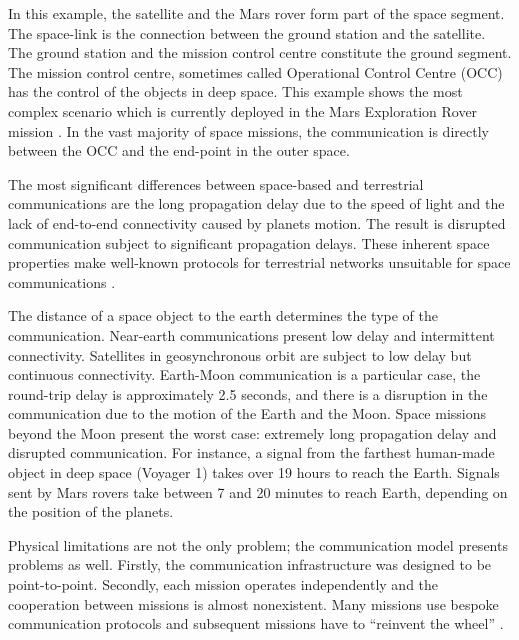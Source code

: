 In this example, the satellite and the Mars rover form part of the space segment. The space-link is the connection between the ground station and the satellite.  The ground station and the mission control centre constitute the ground segment. The mission control centre, sometimes called Operational Control Centre (OCC) has the control of the objects in deep space. This example shows the most complex scenario which is currently deployed in the Mars Exploration Rover mission \cite{crisp2003mars}. In the vast majority of space missions, the communication is directly between the OCC and the end-point in the outer space.

 The most significant differences between space-based and terrestrial communications are the long propagation delay due to the speed of light and the lack of end-to-end connectivity caused by planets motion. The result is disrupted communication subject to significant propagation delays. These inherent space properties make well-known protocols for terrestrial networks unsuitable for space communications \cite{fall2003delay}.


The distance of a space object to the earth determines the type of the communication. Near-earth communications present low delay and intermittent connectivity. Satellites in geosynchronous orbit are subject to low delay but continuous connectivity. Earth-Moon communication is a particular case, the round-trip delay is approximately 2.5 seconds, and there is a disruption in the communication due to the motion of the Earth and the Moon. Space missions beyond the Moon present the worst case: extremely long propagation delay and disrupted communication. For instance,  a signal from the farthest human-made object in deep space (Voyager 1) takes over 19 hours to reach the Earth. Signals sent by Mars rovers take between 7 and 20 minutes to reach Earth, depending on the position of the planets. 



Physical limitations are not the only problem; the communication model presents problems as well. Firstly,  the communication infrastructure was designed to be point-to-point. Secondly, each mission operates independently and the cooperation between missions is almost nonexistent. Many missions use bespoke communication protocols and subsequent missions have to ``reinvent the wheel'' \cite{burleigh2003interplanetary}. 

